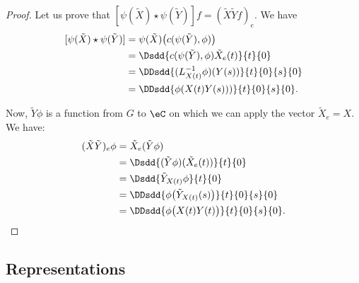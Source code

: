 \begin{proof}
	Let us prove that $[\psi(\tilde X)\star\psi(\tilde Y)]f=(\tilde X\tilde Yf)_e$. We have
	\begin{equation}
		\begin{split}
			[\psi(\tilde X)\star\psi(\tilde Y)]&=\psi(\tilde X)\big( c(\psi(\tilde Y),\phi) \big)\\
			&=\Dsdd{ c(\psi(\tilde Y),\phi)\tilde X_e(t) }{t}{0}\\
			&=\DDsdd{ (L^{-1}_{X(t)}\phi)(Y(s)) }{t}{0}{s}{0}\\
			&=\DDsdd{ \phi(X(t)Y(s))) }{t}{0}{s}{0}.
		\end{split}
	\end{equation}

	Now, $\tilde Y\phi$ is a function from $G$ to $\eC$ on which we can apply the vector $\tilde X_e=X$. We have:
	\begin{equation}
		\begin{split}
			(\tilde X\tilde Y)_e\phi&=\tilde X_e(\tilde Y\phi)\\
			&=\Dsdd{ (\tilde Y\phi)(\tilde X_e(t)) }{t}{0}\\
			&=\Dsdd{ \tilde Y_{X(t)}\phi }{t}{0}\\
			&=\DDsdd{ \phi\big( \tilde Y_{X(t)}(s) \big) }{t}{0}{s}{0}\\
			&=\DDsdd{ \phi\big( X(t)Y(t) \big) }{t}{0}{s}{0}.
		\end{split}
	\end{equation}

\end{proof}

\subsection{Representations}

